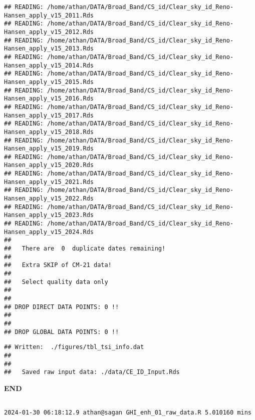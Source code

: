 \documentclass[
  10pt,
  a4paper,oneside]{article}
\begin{document}
\begin{verbatim}
## READING: /home/athan/DATA/Broad_Band/CS_id/Clear_sky_id_Reno-Hansen_apply_v15_2011.Rds 
## READING: /home/athan/DATA/Broad_Band/CS_id/Clear_sky_id_Reno-Hansen_apply_v15_2012.Rds 
## READING: /home/athan/DATA/Broad_Band/CS_id/Clear_sky_id_Reno-Hansen_apply_v15_2013.Rds 
## READING: /home/athan/DATA/Broad_Band/CS_id/Clear_sky_id_Reno-Hansen_apply_v15_2014.Rds 
## READING: /home/athan/DATA/Broad_Band/CS_id/Clear_sky_id_Reno-Hansen_apply_v15_2015.Rds 
## READING: /home/athan/DATA/Broad_Band/CS_id/Clear_sky_id_Reno-Hansen_apply_v15_2016.Rds 
## READING: /home/athan/DATA/Broad_Band/CS_id/Clear_sky_id_Reno-Hansen_apply_v15_2017.Rds 
## READING: /home/athan/DATA/Broad_Band/CS_id/Clear_sky_id_Reno-Hansen_apply_v15_2018.Rds 
## READING: /home/athan/DATA/Broad_Band/CS_id/Clear_sky_id_Reno-Hansen_apply_v15_2019.Rds 
## READING: /home/athan/DATA/Broad_Band/CS_id/Clear_sky_id_Reno-Hansen_apply_v15_2020.Rds 
## READING: /home/athan/DATA/Broad_Band/CS_id/Clear_sky_id_Reno-Hansen_apply_v15_2021.Rds 
## READING: /home/athan/DATA/Broad_Band/CS_id/Clear_sky_id_Reno-Hansen_apply_v15_2022.Rds 
## READING: /home/athan/DATA/Broad_Band/CS_id/Clear_sky_id_Reno-Hansen_apply_v15_2023.Rds 
## READING: /home/athan/DATA/Broad_Band/CS_id/Clear_sky_id_Reno-Hansen_apply_v15_2024.Rds 
## 
##   There are  0  duplicate dates remaining!
## 
##   Extra SKIP of CM-21 data!
## 
##   Select quality data only
## 
## 
## DROP DIRECT DATA POINTS: 0 !!
## 
## 
## DROP GLOBAL DATA POINTS: 0 !!
\end{verbatim}

\begin{verbatim}
## Written:  ./figures/tbl_tsi_info.dat 
## 
## 
##   Saved raw input data: ./data/CE_ID_Input.Rds
\end{verbatim}

\textbf{END}

\begin{verbatim}

2024-01-30 06:18:12.9 athan@sagan GHI_enh_01_raw_data.R 5.010160 mins
\end{verbatim}
\end{document}
